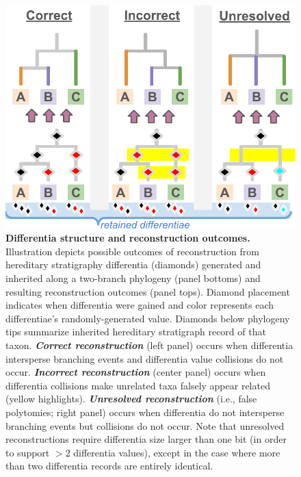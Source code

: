 \begin{figure}
  \centering
  \includegraphics[width=\linewidth]{img/hstrat-failure-modes}
  \caption{%
    \textbf{Differentia structure and reconstruction outcomes.}
    \footnotesize
    Illustration depicts possible outcomes of reconstruction from hereditary stratigraphy differentia (diamonds) generated and inherited along a two-branch phylogeny (panel bottoms) and resulting reconstruction outcomes (panel tops).
    Diamond placement indicates when differentia were gained and color represents each differentiae's randomly-generated value.
    Diamonds below phylogeny tips summarize inherited hereditary stratigraph record of that taxon.
    \textbf{\textit{Correct reconstruction}} (left panel) occurs when differentia intersperse branching events and differentia value collisions do not occur.
    \textbf{\textit{Incorrect reconstruction}} (center panel) occurs when differentia collisions make unrelated taxa falsely appear related (yellow highlights).
    \textbf{\textit{Unresolved reconstruction}} (i.e., false polytomies; right panel) occurs when differentia do not intersperse branching events but collisions do not occur.
    Note that unresolved reconstructions require differentia size larger than one bit (in order to support $>2$ differentia values), except in the case where more than two differentia records are entirely identical.
  }
  \label{fig:hstrat-failure-modes}
\end{figure}
